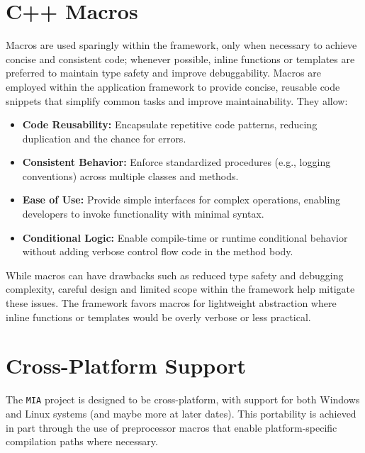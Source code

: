\section{C++ Macros}\label{sec:cpp_macros}
Macros are used sparingly within the framework, only when necessary to achieve concise and consistent code; whenever possible, inline functions or templates are preferred to maintain type safety and improve debuggability. Macros are employed within the application framework to provide concise, reusable code snippets that simplify common tasks and improve maintainability. They allow:
\begin{itemize}\itemsep0em
    \item \textbf{Code Reusability:} Encapsulate repetitive code patterns, reducing duplication and the chance for errors.
    \item \textbf{Consistent Behavior:} Enforce standardized procedures (e.g., logging conventions) across multiple classes and methods.
    \item \textbf{Ease of Use:} Provide simple interfaces for complex operations, enabling developers to invoke functionality with minimal syntax.
    \item \textbf{Conditional Logic:} Enable compile-time or runtime conditional behavior without adding verbose control flow code in the method body.
\end{itemize}
While macros can have drawbacks such as reduced type safety and debugging complexity, careful design and limited scope within the framework help mitigate these issues. The framework favors macros for lightweight abstraction where inline functions or templates would be overly verbose or less practical.
















\section{Cross-Platform Support}

The \texttt{MIA} project is designed to be cross-platform, with support for both Windows and Linux systems (and maybe more at later dates). This portability is achieved in part through the use of preprocessor macros that enable platform-specific compilation paths where necessary.

